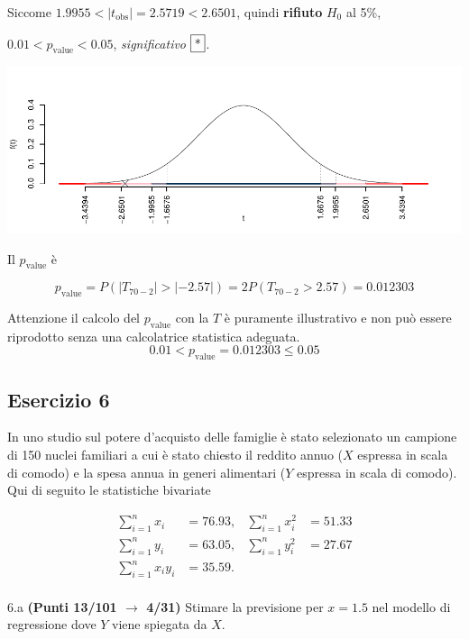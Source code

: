\documentclass[
  11pt,
]{book}
\theoremstyle{mytheoremstyle}
\theoremstyle{mydefstyle}
\newenvironment{sol}
  {
  \begin{tcolorbox}[enhanced,breakable,arc=0.1mm,boxrule=1pt,colback=white,colframe=iblue,
  title=\bf \fontfamily{lmss}\selectfont \hspace{.5 cm} Soluzione,drop fuzzy shadow]

}{
\end{tcolorbox}
  }
\begin{document}
\begin{sol}
Siccome \(1.9955<|t_\text{obs}|=2.5719<2.6501\), quindi \textbf{rifiuto} \(H_0\) al 5\%,

\(0.01<p_\text{value}<0.05\), \emph{significativo} \(\fbox{*}\).

\begin{center}\includegraphics{Esami_passati_con_soluzioni_files/figure-latex/2023-3,-1} \end{center}

Il \(p_{\text{value}}\) è

\[ p_{\text{value}} = P(|T_{70-2}|>|-2.57|)=2P(T_{70-2}>2.57)=0.012303 \]

Attenzione il calcolo del \(p_\text{value}\) con la \(T\) è puramente illustrativo e non può essere riprodotto senza una calcolatrice statistica adeguata.\[
 0.01 < p_\text{value}= 0.012303 \leq 0.05 
\]

\end{sol}

\subsection{Esercizio 6}\label{esercizio-6-17}

In uno studio sul potere d'acquisto delle famiglie è stato selezionato un campione di 150 nuclei familiari
a cui è stato chiesto il reddito annuo (\(X\) espressa in scala di comodo) e la spesa annua in generi alimentari (\(Y\) espressa in scala di comodo). Qui di seguito le statistiche bivariate

\begin{align*}
\sum_{i=1}^n x_i &= 76.93,   &\sum_{i=1}^n x_i^2 &= 51.33 \\
\sum_{i=1}^n y_i &= 63.05,   &\sum_{i=1}^n y_i^2 &= 27.67 \\
\sum_{i=1}^n x_iy_i &= 35.59.    \\
\end{align*}

6.a \textbf{(Punti 13/101 \(\rightarrow\) 4/31)} Stimare la previsione per \(x=1.5\) nel modello di regressione dove \(Y\) viene spiegata da \(X\).
\end{document}
